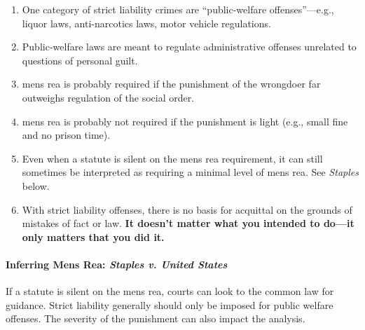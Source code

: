 \begin{enumerate}
    \item One category of strict liability crimes are ``public-welfare 
    offenses''---e.g., liquor laws, anti-narcotics laws, motor vehicle 
    regulations.
    \item Public-welfare laws are meant to regulate administrative offenses 
    unrelated to questions of personal guilt.
    \item mens rea is probably required if the punishment of the wrongdoer far 
    outweighs regulation of the social order.
    \item mens rea is probably not required if the punishment is light (e.g., 
    small fine and no prison time).
    \item Even when a statute is silent on the mens rea requirement, it can 
    still sometimes be interpreted as requiring a minimal level of mens rea. 
    See \emph{Staples} below.
    \item With strict liability offenses, there is no basis for acquittal on 
    the grounds of mistakes of fact or law. \textbf{It doesn't matter what you 
    intended to do---it only matters that you did it.}
\end{enumerate}

\paragraph{Inferring Mens Rea: \emph{Staples v. United States}}

If a statute is silent on the mens rea, courts can look to the common law for 
guidance. Strict liability generally should only be imposed for public welfare 
offenses. The severity of the punishment can also impact the analysis.

